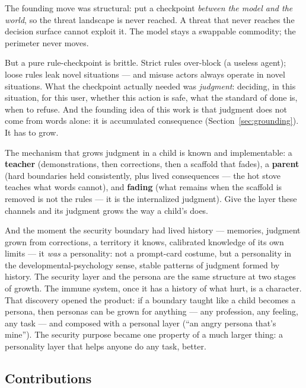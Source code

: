 \documentclass[11pt]{article}
\begin{document}
The founding move was structural: put a checkpoint \emph{between the model and the world}, so the threat landscape is never reached. A threat that never reaches the decision surface cannot exploit it. The model stays a swappable commodity; the perimeter never moves.

But a pure rule-checkpoint is brittle. Strict rules over-block (a useless agent); loose rules leak novel situations --- and misuse actors always operate in novel situations. What the checkpoint actually needed was \emph{judgment}: deciding, in this situation, for this user, whether this action is safe, what the standard of done is, when to refuse. And the founding idea of this work is that judgment does not come from words alone: it is accumulated consequence (Section~\ref{sec:grounding}). It has to grow.

The mechanism that grows judgment in a child is known and implementable: a \textbf{teacher} (demonstrations, then corrections, then a scaffold that fades), a \textbf{parent} (hard boundaries held consistently, plus lived consequences --- the hot stove teaches what words cannot), and \textbf{fading} (what remains when the scaffold is removed is not the rules --- it is the internalized judgment). Give the layer these channels and its judgment grows the way a child's does.

And the moment the security boundary had lived history --- memories, judgment grown from corrections, a territory it knows, calibrated knowledge of its own limits --- it \emph{was} a personality: not a prompt-card costume, but a personality in the developmental-psychology sense, stable patterns of judgment formed by history. The security layer and the persona are the same structure at two stages of growth. The immune system, once it has a history of what hurt, is a character. That discovery opened the product: if a boundary taught like a child becomes a persona, then personas can be grown for anything --- any profession, any feeling, any task --- and composed with a personal layer (``an angry persona that's mine''). The security purpose became one property of a much larger thing: a personality layer that helps anyone do any task, better.

\subsection{Contributions}
\label{sec:contrib}
\end{document}
